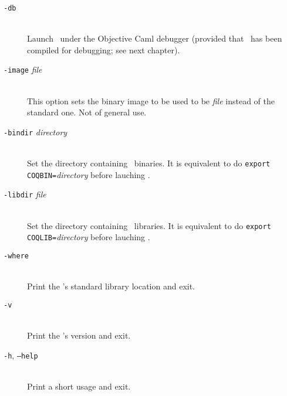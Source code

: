 \begin{description}
\item[{\tt -db}]\ \\
  Launch \Coq\ under the Objective Caml debugger (provided that \Coq\
  has been compiled for debugging; see next chapter).

\item[{\tt -image} {\em file}]\ \\
  This option sets the binary image to be used to be {\em file}
  instead of the standard one. Not of general use.

\item[{\tt -bindir} {\em directory}]\ \\
  Set the directory containing \Coq\ binaries.
  It is equivalent to do \texttt{export COQBIN=}{\em directory}
  before lauching \Coq.

\item[{\tt -libdir} {\em file}]\ \\
  Set the directory containing \Coq\ libraries.
  It is equivalent to do \texttt{export COQLIB=}{\em directory}
  before lauching \Coq.

\item[{\tt -where}]\ \\
  Print the \Coq's standard library location and exit.

\item[{\tt -v}]\ \\
  Print the \Coq's version and exit.

\item[{\tt -h}, {\tt --help}]\ \\
  Print a short usage and exit.
\end{description}




